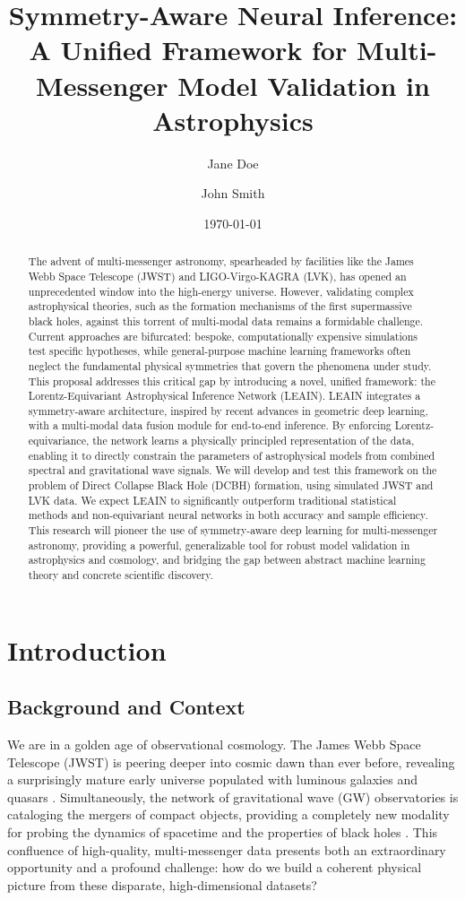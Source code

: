 \documentclass[11pt, a4paper]{article}
\title{\textbf{Symmetry-Aware Neural Inference: A Unified Framework for Multi-Messenger Model Validation in Astrophysics}}
\author[1]{Jane Doe}
\author[2]{John Smith}
\affil[1]{Department of Physics and Astronomy, University of Cambridge}
\affil[2]{Institute for Advanced Study, Princeton}
\date{\today}
\begin{document}
\maketitle

\begin{abstract}
\noindent The advent of multi-messenger astronomy, spearheaded by facilities like the James Webb Space Telescope (JWST) and LIGO-Virgo-KAGRA (LVK), has opened an unprecedented window into the high-energy universe. However, validating complex astrophysical theories, such as the formation mechanisms of the first supermassive black holes, against this torrent of multi-modal data remains a formidable challenge. Current approaches are bifurcated: bespoke, computationally expensive simulations test specific hypotheses, while general-purpose machine learning frameworks often neglect the fundamental physical symmetries that govern the phenomena under study. This proposal addresses this critical gap by introducing a novel, unified framework: the Lorentz-Equivariant Astrophysical Inference Network (LEAIN). LEAIN integrates a symmetry-aware architecture, inspired by recent advances in geometric deep learning, with a multi-modal data fusion module for end-to-end inference. By enforcing Lorentz-equivariance, the network learns a physically principled representation of the data, enabling it to directly constrain the parameters of astrophysical models from combined spectral and gravitational wave signals. We will develop and test this framework on the problem of Direct Collapse Black Hole (DCBH) formation, using simulated JWST and LVK data. We expect LEAIN to significantly outperform traditional statistical methods and non-equivariant neural networks in both accuracy and sample efficiency. This research will pioneer the use of symmetry-aware deep learning for multi-messenger astronomy, providing a powerful, generalizable tool for robust model validation in astrophysics and cosmology, and bridging the gap between abstract machine learning theory and concrete scientific discovery.
\end{abstract}

\section{Introduction}

\subsection{Background and Context}
We are in a golden age of observational cosmology. The James Webb Space Telescope (JWST) is peering deeper into cosmic dawn than ever before, revealing a surprisingly mature early universe populated with luminous galaxies and quasars \cite{larson2023}. Simultaneously, the network of gravitational wave (GW) observatories is cataloging the mergers of compact objects, providing a completely new modality for probing the dynamics of spacetime and the properties of black holes \cite{abbott2016}. This confluence of high-quality, multi-messenger data presents both an extraordinary opportunity and a profound challenge: how do we build a coherent physical picture from these disparate, high-dimensional datasets?
\end{document}
